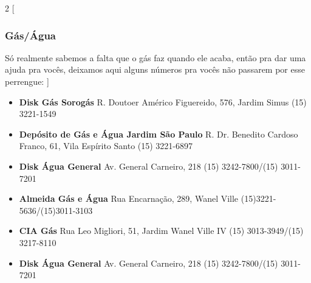 \begin{multicols}{2}
  [
  \subsubsection{Gás/Água}
    Só realmente sabemos a falta que o gás faz quando ele acaba, então pra dar uma ajuda pra vocês, deixamos aqui alguns números pra vocês não passarem por esse perrengue:
  ]
  \begin{itemize}
    \item \textbf{Disk Gás Sorogás}
      \newline R. Doutoer Américo Figuereido, 576, Jardim Simus
      \newline (15) 3221-1549
  \end{itemize}
  \begin{itemize}
    \item \textbf{Depósito de Gás e Água Jardim São Paulo}
      \newline R. Dr. Benedito Cardoso Franco, 61, Vila Espírito Santo
      \newline (15) 3221-6897
  \end{itemize}
  \begin{itemize}
    \item \textbf{Disk Água General}
      \newline Av. General Carneiro, 218
      \newline (15) 3242-7800/(15) 3011-7201
  \end{itemize}
  \begin{itemize}
    \item \textbf{Almeida Gás e Água}
      \newline Rua Encarnação, 289, Wanel Ville
      \newline (15)3221-5636/(15)3011-3103
  \end{itemize}
  \begin{itemize}
    \item \textbf{CIA Gás}
      \newline Rua Leo Migliori, 51, Jardim Wanel Ville IV
      \newline (15) 3013-3949/(15) 3217-8110
  \end{itemize}
  \begin{itemize}
    \item \textbf{Disk Água General}
      \newline Av. General Carneiro, 218
      \newline (15) 3242-7800/(15) 3011-7201
  \end{itemize}
\end{multicols}


